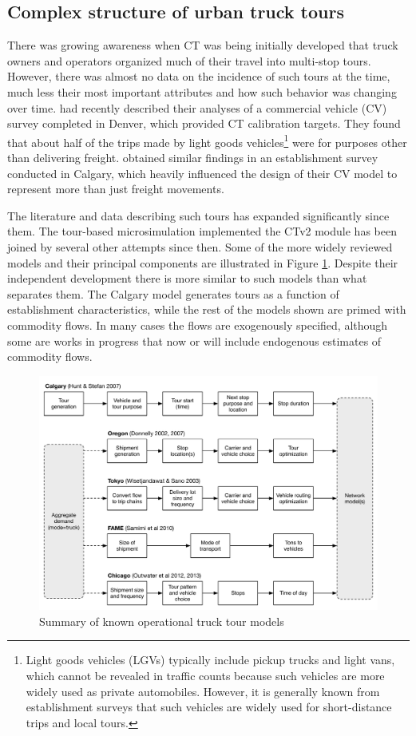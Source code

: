 \subsection{Complex structure of urban truck tours}\label{sec:ct-tour-complexity}
There was growing awareness when CT was being initially developed that truck owners and operators organized much of their travel into multi-stop tours. However, there was almost no data on the incidence of such tours at the time, much less their most important attributes and how such behavior was changing over time. \cite{holguinveras05} had recently described their analyses of a commercial vehicle (CV) survey completed in Denver, which provided CT calibration targets. They found that about half of the trips made by light goods vehicles\footnote{Light goods vehicles (LGVs) typically include pickup trucks and light vans, which cannot be revealed in traffic counts because such vehicles are more widely used as private automobiles. However, it is generally known from establishment surveys that such vehicles are widely used for short-distance trips and local tours.} were for purposes other than delivering freight. \cite{hunt06} obtained similar findings in an establishment survey conducted in Calgary, which heavily influenced the design of their CV model to represent more than just freight movements. 

The literature and data describing such tours has expanded significantly since them. The tour-based microsimulation implemented the CTv2 module has been joined by several other attempts since then. Some of the more widely reviewed models and their principal components are illustrated in Figure \ref{fig:ct-truck-tour-models}. Despite their independent development there is more similar to such models than what separates them. The Calgary model \citep{hunt07} generates tours as a function of establishment characteristics, while the rest of the models shown are primed with commodity flows. In many cases the flows are exogenously specified, although some are works in progress that now or will include endogenous estimates of commodity flows.

\begin{figure}[!t]
\centering
\includegraphics[width=6.5in]{ct/truck-tour-models}
\caption{Summary of known operational truck tour models}
\label{fig:ct-truck-tour-models}
\end{figure}

